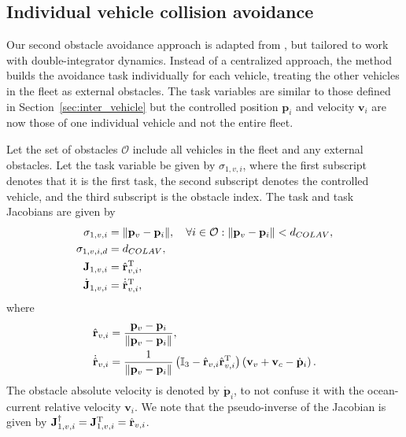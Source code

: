 \subsection{Individual vehicle collision avoidance}\label{sec:individual_colav}
Our second obstacle avoidance approach is adapted from \cite{arrichiello_formation_2006}, but tailored to work with double-integrator dynamics. Instead of a centralized approach, the method builds the avoidance task individually for each vehicle, treating the other vehicles in the fleet as external obstacles. The task variables are similar to those defined in Section~\ref{sec:inter_vehicle} but
the controlled position $\mathbf{p}_i$ and velocity $\mathbf{v}_i$ are now those of one individual vehicle and not the entire fleet. 

Let the set of obstacles $\mathcal{O}$ include all vehicles in the fleet and any external obstacles. Let the task variable be given by $\sigma_{1,v,i}$, where the first subscript denotes that it is the first task, the second subscript denotes the controlled vehicle, and the third subscript is the obstacle index. The task and task Jacobians are given by
\begin{subequations}
\begin{align}
    \sigma_{1,v, i} &= \| \mathbf{p}_v - \mathbf{p}_i\|, \quad \forall i \in \mathcal{O} : \|\mathbf{p}_v - \mathbf{p}_i \| < d_{COLAV},\\
    \sigma_{1,v,i,d} &= d_{COLAV},\\
    \mathbf{J}_{1,v,i} &= \hat{\mathbf{r}}_{v,i}^{\rm T},\\
    \dot{\mathbf{J}}_{1,v,i} &= \dot{\hat{\mathbf{r}}}_{v,i}^{\rm T},   
\end{align}
\end{subequations}
where
\begin{subequations}
\begin{align}
    \hat{\mathbf{r}}_{v,i} &= \frac{\mathbf{p}_v-\mathbf{p}_i}{\|\mathbf{p}_v-\mathbf{p}_i\|},\\
    \dot{\hat{\mathbf{r}}}_{v,i} &=\frac{1}{\|\mathbf{p}_v-\mathbf{p}_i\|}\left(\mathbb{I}_3 - \hat{\mathbf{r}}_{v,i}\hat{\mathbf{r}}_{v,i}^{\rm T}\right) \left(\mathbf{v}_v + \mathbf{v}_c - \dot{\mathbf{p}}_i\right).
\end{align}
\end{subequations}
The obstacle absolute velocity is denoted by $\dot{\mathbf{p}}_i$, to not confuse it with the ocean-current relative velocity $\mathbf{v}_i$. We note that the pseudo-inverse of the Jacobian is given by $\mathbf{J}_{1,v,i}^\dagger = \mathbf{J}_{1,v,i}^{\rm T} = \hat{\mathbf{r}}_{v,i}$.


